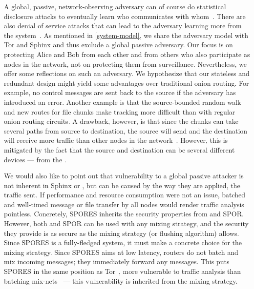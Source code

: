 A global, passive, network-observing adversary can of course do
statistical disclosure attacks to eventually learn who communicates
with whom~\cite{StatisticalDisclosureAttacks}. There are also denial
of service attacks that can lead to the adversary learning more from
the system~\cite{DenialOfSecurity}.  As mentioned in
\cref{system-model}, we share the adversary model with Tor and Sphinx
and thus exclude a global passive adversary. Our focus is on
protecting Alice and Bob from each other and from others who also
participate as nodes in the network, not on protecting them from
surveillance. Nevertheless, we offer some reflections on such an
adversary. We hypothesize that our stateless and redundant design
might yield some advantages over traditional onion routing. For
example, no control messages are sent back to the source if the
adversary has introduced an error.     Another example is that the source-bounded
random walk and new routes for file chunks make tracking more
difficult than with regular onion routing circuits. A drawback, however, is
that since the chunks can take several paths from source to destination, the source 
will send and the destination will receive more traffic than other nodes in the 
network~\cite{RoutingSurveyAnonymousProtocols}. However, this is mitigated by the fact that the source and 
destination can be several different devices --- \ie from the \squads.


We would also like to point out that
vulnerability to a global passive attacker is not inherent in Sphinx
or \Sphinxes, but can be caused by the way they are applied, \ie the
traffic sent. If performance and resource consumption were not an
issue, batched and well-timed message or file transfer by all nodes
would render traffic analysis pointless. Concretely, \Ac{SPORES} inherits the security properties from \Sphinxes and \ac{SPOR}.
However, both \Sphinxes and \ac{SPOR} can be used with any mixing strategy, and 
the security they provide is as secure as the mixing strategy (or flushing 
algorithm) allows.
Since \ac{SPORES} is a fully-fledged system, it must make a concrete choice for 
the mixing strategy.
Since \ac{SPORES} aims at low latency, routers do not batch and mix incoming 
messages; they immediately forward any messages.
This puts \ac{SPORES} in the same position as Tor~\cite{Tor}, \ie more 
vulnerable to traffic analysis than batching 
mix-nets~\cite{RoutingSurveyAnonymousProtocols}  --- this vulnerability is inherited 
from the mixing strategy.





